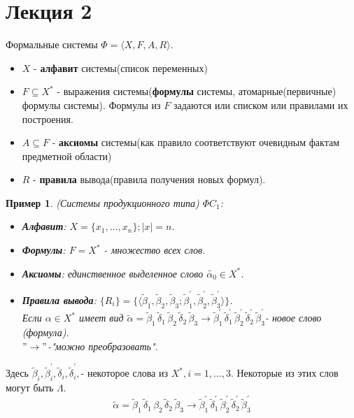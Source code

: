 \documentclass{article}
\newtheorem{example}{Пример}
\numberwithin{example}{section}
\numberwithin{question}{section}
\numberwithin{Remark}{section}
\numberwithin{theorem}{section}
\numberwithin{definition}{section}
\numberwithin{proposition}{section}
\begin{document}
\section{Лекция 2}
Формальные системы $\Phi=\langle  X,F,A,R\rangle$.
\begin{itemize}
	\item $X$ - \textbf{алфавит} системы(список переменных)
	\item $F\subseteq X^*$ - выражения системы(\textbf{формулы} системы, атомарные(первичные) формулы системы). Формулы из $F$ задаются или списком или правилами их построения.
	\item $A\subseteq F$ - \textbf{аксиомы} системы(как правило соответствуют очевидным фактам предметной области)
	\item $R$ - \textbf{правила} вывода(правила получения новых формул).
\end{itemize}
\begin{example}
(Системы продукционного типа) $\Phi C_1$:
\begin{itemize}
	\item \textbf{Алфавит}: $X=\{x_1,\ldots,x_n \};|x|=n.$
	\item \textbf{Формулы}: $F=X^*$ - множество всех слов.
	\item \textbf{Аксиомы}: единственное выделенное слово $\tilde{\alpha_0}\in X^*$.
	\item \textbf{Правила вывода}: $\{R_i \}=\{\langle  \tilde{\beta}_1,\tilde{\beta}_2,\tilde{\beta}_3;\tilde{\beta}_1^{'},\tilde{\beta}_2^{'},\tilde{\beta}_3^{'}\rangle \}$.\\
	Если $ \alpha\in X^*$ имеет вид $\tilde{\alpha}=\tilde{\beta}_1\,\tilde{\delta}_1\,\tilde{\beta}_2\,\tilde{\delta}_2\,\tilde{\beta}_3\rightarrow \tilde{\beta}_1^{'}\,\tilde{\delta}_1^{'}\,\tilde{\beta}_2^{'}\,\tilde{\delta}_2^{'}\,\tilde{\beta}_3^{'}$- новое слово (формула).\\
	$"\rightarrow"$-"можно преобразовать".
\end{itemize}
\end{example}
Здесь $\tilde{\beta}_i ,\tilde{\beta}_i^{'},\tilde{\delta}_i ,\tilde{\delta}_i^{'},$- некоторое слова из $X^*,i=1,\ldots,3$. Некоторые из этих слов могут быть $\Lambda$.\\
\begin{equation*}
\tilde{\alpha}=\tilde{\beta}_1\,\tilde{\delta}_1\,\beta_2\,\tilde{\delta}_2\,\tilde{\beta}_3\rightarrow \tilde{\beta}_1^{'}\,\tilde{\delta}_1^{'}\,\tilde{\beta}_2^{'}\,\tilde{\delta}_2^{'}\,\tilde{\beta}_3^{'}
\end{equation*}
\end{document}
